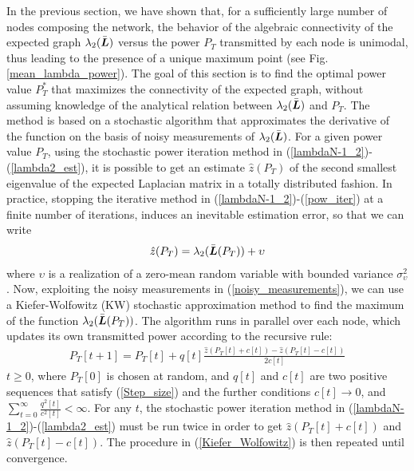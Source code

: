 \documentclass[10pt,twocolumn]{IEEEtran}
\def\bL{\mbox{\boldmath $L$}}
\begin{document}
 In the previous section, we have shown that, for a sufficiently large number of nodes composing the network, the behavior of the algebraic connectivity of the expected graph $\lambda_2(\bar{\bL})$ versus the power $P_T$ transmitted by each node is unimodal, thus leading to the presence of a unique maximum point (see Fig. \ref{mean_lambda_power}). The goal of this section is to find the optimal power value $P_T^*$ that maximizes the connectivity of the expected graph, without assuming knowledge of the analytical relation between $\lambda_2(\bar{\bL})$ and $P_T$. The method is based on a stochastic algorithm that approximates the derivative of the function on the basis of noisy measurements of $\lambda_2(\bar{\bL})$.
For a given power value $P_T$, using the stochastic power iteration method in (\ref{lambdaN-1_2})-(\ref{lambda2_est}), it is possible to get an estimate $\hat{z}(P_T)$ of the second smallest eigenvalue of the expected Laplacian matrix in a totally distributed fashion. In practice, stopping the iterative method  in (\ref{lambdaN-1_2})-(\ref{pow_iter}) at a finite number of iterations, induces an inevitable estimation error, so that we can write
\begin{eqnarray}\label{noisy_measurements}
\hat{z}(P_T)=\lambda_{2}(\bar{\bL}(P_T))+\upsilon
\end{eqnarray}
where $\upsilon$ is a realization of a zero-mean random variable with bounded variance $\sigma^2_\upsilon$.
Now, exploiting the noisy measurements in (\ref{noisy_measurements}), we can use a Kiefer-Wolfowitz (KW) stochastic approximation  method \cite{Nevel} to find the maximum of the function $\lambda_{2}(\bar{\bL}(P_T))$. The algorithm  runs in parallel over  each node, which updates its own transmitted power according to the recursive rule:
\begin{eqnarray}\label{Kiefer_Wolfowitz}
P_T[t+1]=P_T[t]+q[t]\frac{\hat{z}(P_T[t]+c[t])-\hat{z}(P_T[t]-c[t])}{2c[t]}
\end{eqnarray}
$t\geq0$, where $P_T[0]$ is chosen at random, and $q[t]$ and $c[t]$ are two positive sequences that satisfy (\ref{Step_size}) and the further conditions
$c[t]\rightarrow 0$, and  $\sum_{t=0}^{\infty}\frac{q^2[t]}{c^2[t]}<\infty$.
For any $t$, the stochastic power iteration method in (\ref{lambdaN-1_2})-(\ref{lambda2_est}) must be run twice in order to get $\hat{z}(P_T[t]+c[t])$ and $\hat{z}(P_T[t]-c[t])$. The procedure in (\ref{Kiefer_Wolfowitz}) is then repeated until convergence.
\end{document}
